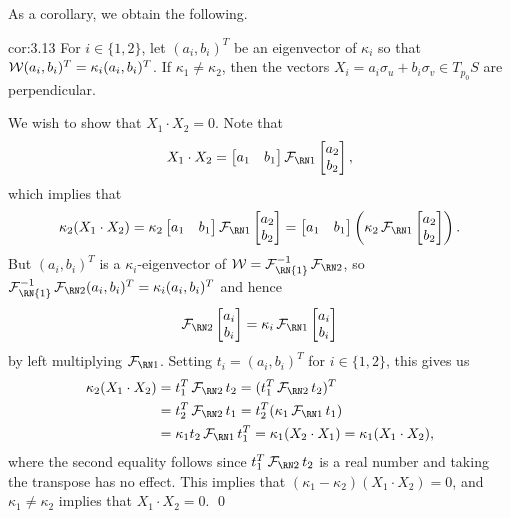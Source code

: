 As a corollary, we obtain the following. 

\begin{cor}{cor:3.13}
    For $i \in \{1, 2\}$, let $(a_i, b_i)^T$ be an eigenvector of 
    $\kappa_i$ so that ${\cal W}(a_i, b_i)^T = \kappa_i (a_i, b_i)^T$. If $\kappa_1 \neq \kappa_2$, 
    then the vectors $X_i = a_i \sigma_u + b_i \sigma_v \in T_{p_0}S$ 
    are perpendicular. 
\end{cor}\vspace{-0.25cm}
\begin{pf}
    We wish to show that $X_1 \cdot X_2 = 0$. Note that 
    \[ X_1 \cdot X_2 = \begin{bmatrix}
        a_1 & b_1 
    \end{bmatrix} \FFF \begin{bmatrix}
        a_2 \\ b_2 
    \end{bmatrix}, \] 
    which implies that 
    \[ \kappa_2(X_1 \cdot X_2) = \kappa_2 \begin{bmatrix}
        a_1 & b_1 
    \end{bmatrix} \FFF \begin{bmatrix}
        a_2 \\ b_2 
    \end{bmatrix} = \begin{bmatrix}
        a_1 & b_1 
    \end{bmatrix} \left( \kappa_2 \FFF \begin{bmatrix}
        a_2 \\ b_2 
    \end{bmatrix} \right). \] 
    But $(a_i, b_i)^T$ is a $\kappa_i$-eigenvector of ${\cal W} = 
    {\cal F}_{\text{\RN{1}}}^{-1} \SFF$, so 
    ${\cal F}_{\text{\RN{1}}}^{-1} \SFF (a_i, b_i)^T 
    = \kappa_i (a_i, b_i)^T$ and hence 
    \[ \SFF \begin{bmatrix}
        a_i \\ b_i 
    \end{bmatrix} = \kappa_i \FFF \begin{bmatrix}
        a_i \\ b_i 
    \end{bmatrix} \] 
    by left multiplying $\FFF$. Setting $t_i = (a_i, b_i)^T$ 
    for $i \in \{1, 2\}$, this gives us
    \begin{align*}
        \kappa_2(X_1 \cdot X_2) 
        &= t_1^T \SFF t_2  
        = (t_1^T \SFF t_2)^T \\
        &= t_2^T \SFF t_1 
        = t_2^T (\kappa_1 \FFF t_1) \\ 
        &= \kappa_1 t_2 \FFF t_1^T 
        = \kappa_1 (X_2 \cdot X_1) 
        = \kappa_1 (X_1 \cdot X_2),
    \end{align*}
    where the second equality follows since $t_1^T \SFF t_2$ is 
    a real number and taking the transpose has no effect. 
    This implies that $(\kappa_1 - \kappa_2)(X_1 \cdot X_2) = 0$, and 
    $\kappa_1 \neq \kappa_2$ implies that $X_1 \cdot X_2 = 0$. \qed 
\end{pf}\vspace{-0.25cm}

